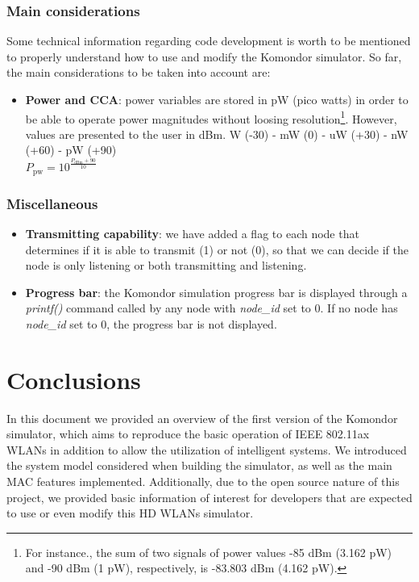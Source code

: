 \documentclass[a4paper]{article}
\begin{document}
		\subsubsection{Main considerations}
		\label{section:development_considerations}
		Some technical information regarding code development is worth to be mentioned to properly understand how to use and modify the Komondor simulator. So far, the main considerations to be taken into account are:		
		\begin{itemize}
		\item \textbf{Power and CCA}: power variables are stored in pW (pico watts) in order to be able to operate power magnitudes without loosing resolution\footnote{For instance., the sum of two signals of power values -85 dBm (3.162 pW) and -90 dBm (1 pW), respectively, is -83.803 dBm (4.162 pW).}. However, values are presented to the user in dBm.		
		W (-30)  - mW (0)  - uW (+30) - nW (+60) - pW (+90)\\
		$P_{\text{pw}} = 10^{\frac{P_{\text{dBm}} + 90}{10}}$
		\end{itemize}
	
		\subsubsection{Miscellaneous}
		\label{section:development_miscellany}
			\begin{itemize}
			\item \textbf{Transmitting capability}: we have added a flag to each node that determines if it is able to transmit (1) or not (0), so that we can decide if the node is only listening or both transmitting and listening.
			\item \textbf{Progress bar}: the Komondor simulation progress bar is displayed through a \textit{printf()} command called by any node with \textit{node\_id} set to 0. If no node has \textit{node\_id} set to 0, the progress bar is not displayed.
			\end{itemize}
	
\section{Conclusions}
\label{section:conclusions}
In this document we provided an overview of the first version of the Komondor simulator, which aims to reproduce the basic operation of IEEE 802.11ax WLANs in addition to allow the utilization of intelligent systems. We introduced the system model considered when building the simulator, as well as the main MAC features implemented. Additionally, due to the open source nature of this project, we provided basic information of interest for developers that are expected to use or even modify this HD WLANs simulator.
\end{document}
